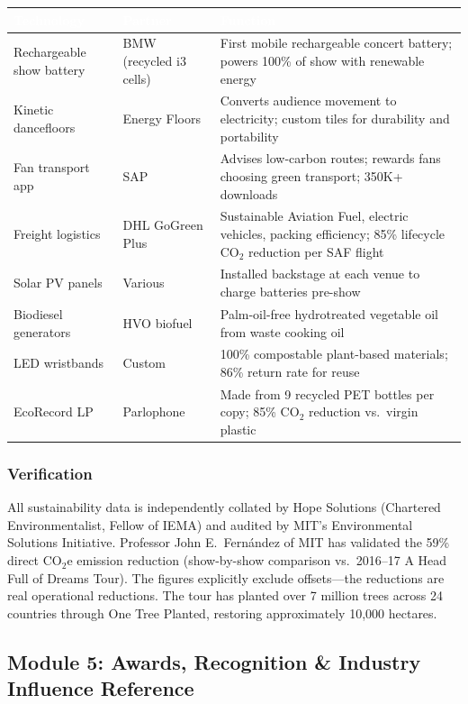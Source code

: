 \documentclass[11pt,letterpaper]{article}
\newcommand{\tableheader}[1]{\textbf{\sffamily\textcolor{white}{#1}}}
\begin{document}
\begin{center}
\begin{tabularx}{\textwidth}{L{3.5cm}L{3cm}X}
\toprule
{}
\tableheader{Technology} & \tableheader{Partner} & \tableheader{Function} \\
\midrule
Rechargeable show battery & BMW (recycled i3 cells) & First mobile rechargeable concert battery; powers 100\% of show with renewable energy \\
Kinetic dancefloors & Energy Floors & Converts audience movement to electricity; custom tiles for durability and portability \\
Fan transport app & SAP & Advises low-carbon routes; rewards fans choosing green transport; 350K+ downloads \\
Freight logistics & DHL GoGreen Plus & Sustainable Aviation Fuel, electric vehicles, packing efficiency; 85\% lifecycle CO$_2$ reduction per SAF flight \\
Solar PV panels & Various & Installed backstage at each venue to charge batteries pre-show \\
Biodiesel generators & HVO biofuel & Palm-oil-free hydrotreated vegetable oil from waste cooking oil \\
LED wristbands & Custom & 100\% compostable plant-based materials; 86\% return rate for reuse \\
EcoRecord LP & Parlophone & Made from 9 recycled PET bottles per copy; 85\% CO$_2$ reduction vs.\ virgin plastic \\
\bottomrule
\end{tabularx}
\end{center}

\subsubsection{Verification}

All sustainability data is independently collated by Hope Solutions (Chartered Environmentalist, Fellow of IEMA) and audited by MIT's Environmental Solutions Initiative. Professor John E.\ Fernández of MIT has validated the 59\% direct CO$_2$e emission reduction (show-by-show comparison vs.\ 2016--17 A Head Full of Dreams Tour). The figures explicitly exclude offsets---the reductions are real operational reductions. The tour has planted over 7 million trees across 24 countries through One Tree Planted, restoring approximately 10,000 hectares.

\subsection{Module 5: Awards, Recognition \& Industry Influence Reference}
\end{document}
